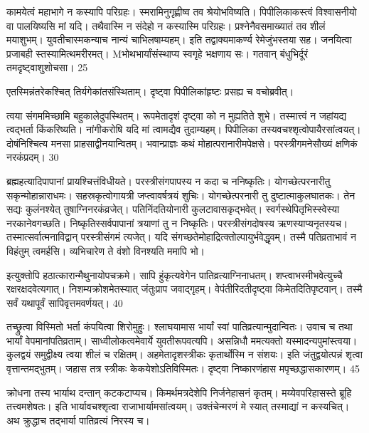   कामयेत्वं महाभागे न कस्यापि परिग्रहः।
 स्मरामिनुगृह्णीष्व तव श्रेयोभविष्यति।
 पिपीलिकाकस्त्वं विश्वासनीयो वा पालयिष्यसि मां यदि।
 तथैवास्मि न संदेहो न कस्यास्मि परिग्रहः।
 प्रश्नेनैवसमाख्यातं तव शीलं मयाशुभम्।
 युवतीचास्मकन्याच नान्यं चाभिलषाम्यहम्।
 इति तद्वाक्यमाकर्ण्य रेमेजुंभस्तया सह।
 जनयित्वा प्रजाबही स्तस्यामित्थमरीरमत्।
 Mभोथभार्यांसंस्थाप्य स्वगृहे भक्षणाय सः।
 गतवान् बंधुभिर्दूरं तमदृष्ट्वाशुशोचसा।
 25

  एतस्मिन्नंतरेकश्चित् तिर्यगेकांतसंस्थिताम्।
 दृष्ट्वा पिपीलिकांहृष्टः प्रसह्य च वचोब्रवीत्।
 
त्वया संगममिच्छामि बहुकालेदुपस्थितम्।
 रूपमेतादृशं दृष्ट्वा को न मुह्यतिते शुभे।
 तस्मात्त्वं न जहांयद्य त्वद्भर्ता किंकरिष्यति।
 नांगीकरोषि यदि मां त्वामद्यैव तुदाम्यहम्।
 पिपीलिका तस्यवचश्शृत्वोपायैरसांत्वयत्।
 दोषंनिश्चित्य मनसा प्राहसाद्वीनयान्वितम्।
 भवान्प्राज्ञः कथं मोहात्परानारीमपेक्षसे।
 परस्त्रीगमनेसौख्यं क्षणिकं नरकंप्रदम्।
 30

  ब्रह्महत्यादिपापानां प्रायश्चित्तंविधीयते।
 परस्त्रीसंगपापस्य न कदा च ननिष्कृतिः।
 योगच्छेत्परनारीतु सकृन्मोहान्नाराधमः।
 सहस्रकृत्वोगायत्री जप्त्वावर्षत्रयं शुचिः।
 योगच्छेत्परनारी तु दुष्टात्माकुलघातकः।
 तेन सद्यः कुलंनश्येत् तुषाग्निनरकंव्रजेत्।
 पतिनिंदतियोनारी कुलटावासकृद्भवेत्।
 स्वर्गस्थेपितृभिस्स्वेस्या नरकानेवगच्छति।
 निष्कृतिस्सर्वपापानां त्रयाणां तु न निष्कृतिः।
 परस्त्रीसंगदोषस्य ऋणस्याप्यनृतस्यच।
 तस्मात्सर्वात्मनाविद्वान् परस्त्रीसंगमं त्यजेत्।
 यदि संगच्छतेमोहाद्रित्क्तोल्पायुर्भवेद्धृवम्।
 तस्मै पतिव्रताभावं न विहंतुम् त्वमर्हसि।
 व्यभिचारेण ते वंशो विनश्यति ममापि भो।
 
इत्युक्तोपि हठात्कारान्मैथुनायोपचक्रमे।
 सापि हुंकृत्यवेगेन पातिव्रत्याग्निनाधतम्।
 शप्त्वाभस्मीभवेत्युच्चै रक्षरक्षदवेत्यगात्।
 निशम्यक्रोशमेतस्यात् जंतुःप्राप जवाद्गृहम्।
 वेपंतीरिदतीदृष्ट्वा किमेतदितिपृष्टवान्।
 तस्मै सर्वं यथापूर्वं सापिवृत्तमवर्णयत्।
 40

  तच्छ्रुत्वा विस्मितो भर्ता कंपयित्वा शिरोमुहुः।
 श्लाघयामास भार्यां स्वां पातिव्रत्यान्मुदान्वितः।
 उवाच च तथा भार्यां वेपमानांपतिव्रताम्।
 साध्वीलोकत्वमेवार्ये युवतीरूपवत्यपि।
 असन्निधौ ममत्यक्तो यस्मादन्यपुमांस्त्वया।
 कुलद्वयं समुद्वीक्ष्य त्वया शीलं च रक्षितम्।
 अहमेतादृशस्त्रीकः कृतार्थोस्मि न संशयः।
 इति जंतुद्वयोत्पन्नं शृत्वा वृत्तान्तमद्भुतम्।
 जहास तत्र स्त्रीकः केकयेशोऽतिविस्मितः।
 दृष्ट्वा निष्कारणंहास मपृच्छद्धासकारणम्।
 45

  क्रोधना तस्य भार्याथ दन्तान् कटकटाप्यच।
 किमर्थमत्रदेशेपि निर्जनेहासनं कृतम्।
 मय्येवपरिहासस्ते ब्रूहि तत्त्वमशेषतः।
 इति भार्यावचश्शृत्वा राजाभार्यामसांत्वयम्।
 उक्तंचेन्मरणं मे स्यात् तस्माद्यां न कस्यचित्।
 अथ क्रुद्धाच तद्भार्या पातिव्रत्यं निरस्य च।
 
